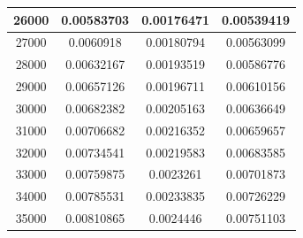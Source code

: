 \begin{center}
\begin{tabular}{| c | c | c | c |}
26000 & 0.00583703 & 0.00176471 & 0.00539419 \\ \hline
27000 & 0.0060918 & 0.00180794 & 0.00563099 \\ \hline
28000 & 0.00632167 & 0.00193519 & 0.00586776 \\ \hline
29000 & 0.00657126 & 0.00196711 & 0.00610156 \\ \hline
30000 & 0.00682382 & 0.00205163 & 0.00636649 \\ \hline
31000 & 0.00706682 & 0.00216352 & 0.00659657 \\ \hline
32000 & 0.00734541 & 0.00219583 & 0.00683585 \\ \hline
33000 & 0.00759875 & 0.0023261 & 0.00701873 \\ \hline
34000 & 0.00785531 & 0.00233835 & 0.00726229 \\ \hline
35000 & 0.00810865 & 0.0024446 & 0.00751103 \\ \hline
\hline
\end{tabular}
\end{center}
